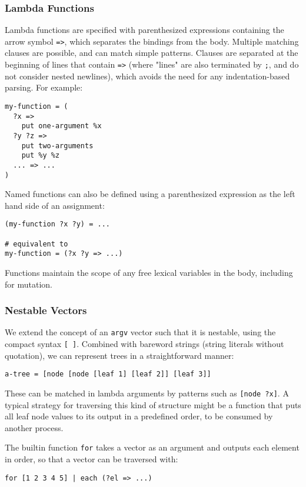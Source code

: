 \ifsigpro{ \documentclass[english,PRO]{ipsj} }
\begin{document}
\subsubsection{Lambda Functions}\noindent
Lambda functions are specified with parenthesized expressions containing the arrow symbol \verb/=>/, which separates the bindings from the body. Multiple matching clauses are possible, and can match simple patterns. Clauses are separated at the beginning of lines that contain \verb/=>/ (where "lines" are also terminated by \verb/;/, and do not consider nested newlines), which avoids the need for any indentation-based parsing. For example:
\begin{lstlisting}
my-function = (
  ?x =>
    put one-argument %x
  ?y ?z =>
    put two-arguments
    put %y %z
  ... => ...
)
\end{lstlisting}

\noindent
Named functions can also be defined using a parenthesized expression as the left hand side of an assignment:
\begin{lstlisting}
(my-function ?x ?y) = ...

# equivalent to
my-function = (?x ?y => ...)
\end{lstlisting}

\noindent
Functions maintain the scope of any free lexical variables in the body, including for mutation.

\subsubsection{Nestable Vectors}\noindent
We extend the concept of an \verb/argv/ vector such that it is nestable, using the compact syntax \verb/[ ]/. Combined with bareword strings (string literals without quotation), we can represent trees in a straightforward manner:
\begin{lstlisting}
a-tree = [node [node [leaf 1] [leaf 2]] [leaf 3]]
\end{lstlisting}
\noindent
These can be matched in lambda arguments by patterns such as \verb/[node ?x]/. A typical strategy for traversing this kind of structure might be a function that puts all leaf node values to its output in a predefined order, to be consumed by another process.

The builtin function \verb/for/ takes a vector as an argument and outputs each element in order, so that a vector can be traversed with:
\begin{lstlisting}
for [1 2 3 4 5] | each (?el => ...)
\end{lstlisting}
\end{document}
